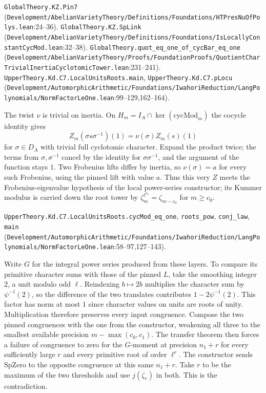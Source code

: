 {\footnotesize \nolinkurl{GlobalTheory.KZ.Pin7} (\nolinkurl{Development/AbelianVarietyTheory/Definitions/Foundations/HTPresNuOfPolys.lean}\allowbreak:24--36). \nolinkurl{GlobalTheory.KZ.SpLink} (\nolinkurl{Development/AbelianVarietyTheory/Definitions/Foundations/IsLocallyConstantCycMod.lean}\allowbreak:32--38). \nolinkurl{GlobalTheory.quot_eq_one_of_cycBar_eq_one} (\nolinkurl{Development/AbelianVarietyTheory/Proofs/FoundationProofs/QuotientCharTrivialInertiaCyclotomicTower.lean}\allowbreak:231--241). \nolinkurl{UpperTheory.Kd.C7.LocalUnitsRoots.main}, \nolinkurl{UpperTheory.Kd.C7.pLocu} (\nolinkurl{Development/AutomorphicArithmetic/Foundations/IwahoriReduction/LangPolynomials/NormFactorLeOne.lean}\allowbreak:99--129,162--164).}

The twist $\nu$ is trivial on inertia. On $H_m=I_A\cap\ker(\mathrm{cycMod}_m)$ the cocycle identity gives
\[
 Z_m(\sigma s\sigma^{-1})(1)=\nu(\sigma)Z_m(s)(1)
\]
for $\sigma\in D_A$ with trivial full cyclotomic character. Expand the product twice; the terms from $\sigma,\sigma^{-1}$ cancel by the identity for $\sigma\sigma^{-1}$, and the argument of the function stays $1$. Two Frobenius lifts differ by inertia, so $\nu(\sigma)=a$ for every such Frobenius, using the pinned lift with value $a$. Thus this very $Z$ meets the Frobenius-eigenvalue hypothesis of the local power-series constructor; its Kummer modulus is carried down the root tower by $\zeta_m^{\ell^{c_0}}=\zeta_{m-c_0}$ for $m\ge c_0$.

{\footnotesize \nolinkurl{UpperTheory.Kd.C7.LocalUnitsRoots.cycMod_eq_one}, \nolinkurl{roots_pow}, \nolinkurl{conj_law}, \nolinkurl{main} (\nolinkurl{Development/AutomorphicArithmetic/Foundations/IwahoriReduction/LangPolynomials/NormFactorLeOne.lean}\allowbreak:58--97,127--143).}

Write $G$ for the integral power series produced from these layers. To compare its primitive character sums with those of the pinned $L$, take the smoothing integer $2$, a unit modulo odd $\ell$. Reindexing $b\mapsto 2b$ multiplies the character sum by $\psi^{-1}(2)$, so the difference of the two translates contributes $1-2\psi^{-1}(2)$. This factor has norm at most $1$ since character values on units are roots of unity. Multiplication therefore preserves every input congruence. Compose the two pinned congruences with the one from the constructor, weakening all three to the smallest available precision $m-\max(c_0,c_1)$. The transfer theorem then forces a failure of congruence to zero for the $G$-moment at precision $n_1+r$ for every sufficiently large $r$ and every primitive root of order $\ell^r$. The constructor sends $\mathrm{SpZero}$ to the opposite congruence at this same $n_1+r$. Take $r$ to be the maximum of the two thresholds and use $j(\zeta_r)$ in both. This is the contradiction.

